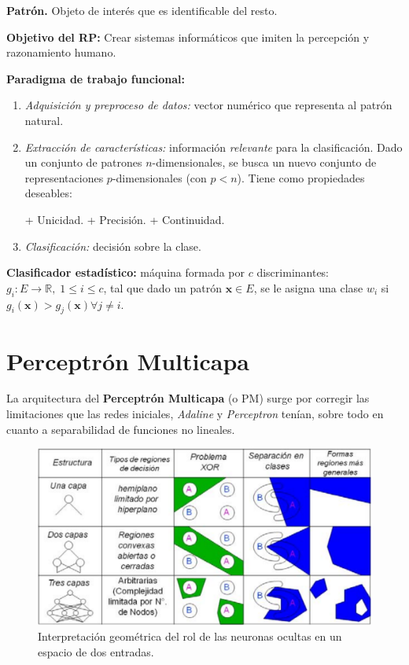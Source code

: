 \documentclass[10pt,a4paper]{article}
\begin{document}
\begin{description}
\item \textbf{Patrón.} Objeto de interés que es identificable del resto.
\item \textbf{Objetivo del RP:} Crear sistemas informáticos que imiten la percepción y razonamiento humano.
\item \textbf{Paradigma de trabajo funcional:}
\begin{enumerate}
\item \textit{Adquisición y preproceso de datos:} vector numérico que representa al patrón natural.
\item \textit{Extracción de características:} información \textit{relevante} para la clasificación. Dado un conjunto de patrones $n$-dimensionales, se busca un nuevo conjunto de representaciones $p$-dimensionales (con $p<n$). Tiene como propiedades deseables:
\begin{multicols}{3}
\subitem + Unicidad.
\subitem + Precisión.
\subitem + Continuidad.
\end{multicols}
\item \textit{Clasificación:} decisión sobre la clase.
\end{enumerate}
\item \textbf{Clasificador estadístico:} máquina formada por $c$ discriminantes: $g_i : E \rightarrow \mathbb{R}, \; 1 \leq i \leq c$, tal que dado un patrón $\mathbf{x} \in E$, se le asigna una clase $w_i$ si $g_i(\mathbf{x}) >g_j(\mathbf{x}) \forall j \neq i$.
\end{description}

\section{Perceptrón Multicapa}

La arquitectura del \textbf{Perceptrón Multicapa} (o PM) surge por corregir las limitaciones que las redes iniciales, \textit{Adaline} y \textit{Perceptron} tenían, sobre todo en cuanto a separabilidad de funciones no lineales.

\begin{figure}
  \label{fig:layers}
  \caption{Interpretación geométrica del rol de las neuronas ocultas en un espacio de dos entradas.}
  \centering
  \hbox{\includegraphics[width=0.65\textwidth-\fboxrule-\fboxrule]{layers.png}}  
\end{figure}	
\end{document}

